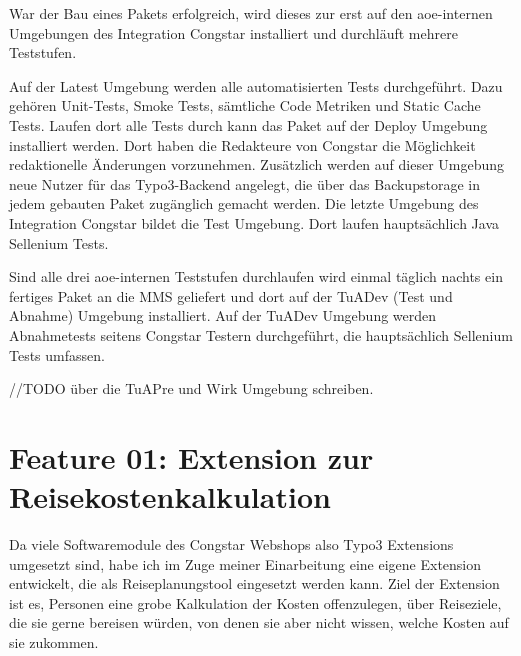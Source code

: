 \documentclass[11pt,a4paper]{article} %
\begin{document}
War der Bau eines Pakets erfolgreich, wird dieses zur erst auf den aoe-internen Umgebungen des Integration Congstar installiert und durchläuft mehrere Teststufen.

Auf der Latest Umgebung werden alle automatisierten Tests durchgeführt. Dazu gehören Unit-Tests, Smoke Tests, sämtliche Code Metriken und Static Cache Tests. Laufen dort alle Tests durch kann das Paket auf der Deploy Umgebung installiert werden. Dort haben die Redakteure von Congstar die Möglichkeit redaktionelle Änderungen vorzunehmen. Zusätzlich werden auf dieser Umgebung neue Nutzer für das Typo3-Backend angelegt, die über das Backupstorage in jedem gebauten Paket zugänglich gemacht werden. Die letzte Umgebung des Integration Congstar bildet die Test Umgebung. Dort laufen hauptsächlich Java Sellenium Tests.

Sind alle drei aoe-internen Teststufen durchlaufen wird einmal täglich nachts ein fertiges Paket an die MMS geliefert und dort auf der TuADev (Test und Abnahme) Umgebung installiert. Auf der TuADev Umgebung werden Abnahmetests seitens Congstar Testern durchgeführt, die hauptsächlich Sellenium Tests umfassen.

//TODO über die TuAPre und Wirk Umgebung schreiben. 


\section{Feature 01: Extension zur Reisekostenkalkulation} \label{sec:pipeline}

Da viele Softwaremodule des Congstar Webshops also Typo3 Extensions umgesetzt sind, habe ich im Zuge 
meiner Einarbeitung eine eigene Extension entwickelt, die als Reiseplanungstool eingesetzt werden kann.
Ziel der Extension ist es, Personen eine grobe Kalkulation der Kosten offenzulegen, über Reiseziele, die sie gerne bereisen würden, von denen sie aber nicht wissen, welche Kosten auf sie zukommen. 





\newpage


\newpage


%
\end{document}
